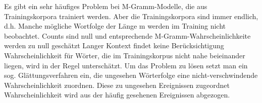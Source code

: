 Es gibt ein sehr h\"aufiges Problem bei M-Gramm-Modelle, die aus Trainingskorpora trainiert werden. Aber die Trainingskorpora sind immer endlich, d.h. Manche m\"ogliche Wortfolge der L\"ange m werden im Training nicht beobachtet. Counts sind null und entsprechende M-Gramm-Wahrscheinlichkeite werden zu null gesch\"atzt Langer Kontext findet keine Ber\"ucksichtigung Wahrscheinlichkeit f\"ur W\"orter, die im Trainingskorpus nicht nahe beieinander liegen, wird in der Regel untersch\"atzt.
Um das Problem zu l\"osen setzt man ein sog. Gl\"attungsverfahren ein, die ungesehen W\"orterfolge eine nicht-verschwindende Wahrscheinlichkeit zuordnen. Diese zu ungesehen Ereignissen zugeordnet Wahrscheinlichkeit wird aus der h\"aufig gesehenen Ereignissen abgezogen.
